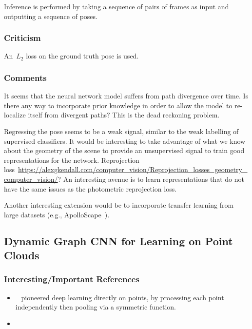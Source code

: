 \documentclass[a4paper, 12pt]{article}
\begin{document}
Inference is performed by taking a sequence of pairs of frames as input and
outputting a sequence of poses.


\subsubsection{Criticism}

An~$L_2$ loss on the ground truth pose is used.


\subsubsection{Comments}

It seems that the neural network model suffers from path divergence over time.
Is there any way to incorporate prior knowledge in order to allow the model to
re-localize itself from divergent paths? This is the dead reckoning problem.

Regressing the pose seems to be a weak signal, similar to the weak labelling of
supervised classifiers. It would be interesting to take advantage of what we
know about the geometry of the scene to provide an unsupervised signal to train
good representations for the network. Reprojection
loss~\url{https://alexgkendall.com/computer_vision/Reprojection_losses_geometry_computer_vision/}?
An interesting avenue is to learn representations that do not have the same
issues as the photometric reprojection loss.

Another interesting extension would be to incorporate transfer learning from
large datasets (e.g., ApolloScape~\citet{huang-apolloscape-2018}).


\subsection{Dynamic Graph CNN for Learning on Point
            Clouds~\cite{dgcnn2018wang}}


\subsubsection{Interesting/Important References}

\begin{itemize}
        \item~\cite{qi2016pointnet} pioneered deep learning directly on points,
                by processing each point independently then pooling via a
                symmetric function.

        \item~\cite{bruna2013dynamic}
\end{itemize}
\end{document}
